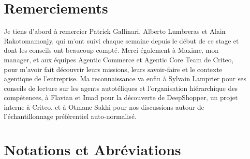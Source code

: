 \documentclass[11pt,a4paper]{article}
\begin{document}
\newpage




\section*{Remerciements}

Je tiens d'abord à remercier Patrick Gallinari, Alberto Lumbreras et Alain Rakotomamonjy, qui m'ont suivi chaque semaine depuis le début de ce stage et dont les conseils ont beaucoup compté. Merci également à Maxime, mon manager, et aux équipes Agentic Commerce et Agentic Core Team de Criteo, pour m'avoir fait découvrir leurs missions, leurs savoir-faire et le contexte agentique de l'entreprise. Ma reconnaissance va enfin à Sylvain Lamprier pour ses conseils de lecture sur les agents autotéliques et l'organisation hiérarchique des compétences, à Flavian et Imad pour la découverte de DeepShopper, un projet interne à Criteo, et à Otmane Sakhi pour nos discussions autour de l'échantillonnage préférentiel auto-normalisé.



\text




\vspace{0.5cm}

\newpage
\setcounter{tocdepth}{2} %
\tableofcontents

\newpage
\section*{Notations et Abréviations}
\end{document}
